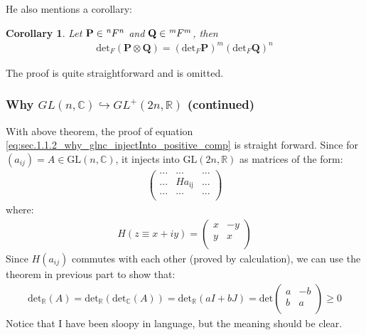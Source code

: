 \documentclass{article}
\numberwithin{equation}{subsection} %
\newtheorem{coro}{Corollary}[section]
\theoremstyle{definition}
\begin{document}
        He also mentions a corollary:
        \begin{coro}
            Let $\mathbf{P}\in \tensor[^n]{F}{^n}$ and $\mathbf{Q}\in
            \tensor[^m]{F}{^m}$, then
            \begin{align}
                \text{det}_F (\mathbf{P\otimes Q}) =
                (\text{det}_F \mathbf{P}) ^m (\text{det}_F \mathbf{Q})^n
            \end{align}
        \end{coro}

        The proof is quite straightforward and is omitted.

        \subsubsection{Why \texorpdfstring{
                $GL(n, \mathbb{C}) \hookrightarrow GL^+(2n,\mathbb{R})$
                }{}(continued)
            }
        With above theorem, the proof of equation 
        \ref{eq:sec.1.1.2_why_glnc_injectInto_positive_comp} 
        is straight forward. Since for 
        $(a_{ij})= A\in \mathrm{GL}(n,\mathbb{C})$, it injects into
        $\mathrm{GL}(2n,\mathbb{R})$ as matrices of the form:
        \begin{align*}
            \left( \begin{array}{ccc}
             \text{...} & \text{...} & \text{...} \\
             \text{...} & H a_{\text{ij}} & \text{...} \\
             \text{...} & \text{...} & \text{...} \\
            \end{array} \right)
        \end{align*}
        where:
        \begin{align*}
            H(z\equiv x+iy)=\left( \begin{array}{cc}
                    x & -y \\
                    y & x \\
            \end{array}\right)
        \end{align*}
        Since $H(a_{ij})$ commutes with each other (proved by calculation),
        we can use the theorem in previous part to show that:
        \begin{align*}
            \mathrm{det_\mathbb{R}}(A) =
            \mathrm{det_\mathbb{R}}  (\mathrm{det_\mathbb{C}}(A))
            = \mathrm{det}_\mathbb{R}(aI+bJ)
            =\mathrm{det}\left(\begin{array}{cc}
                    a & -b\\
                    b & a\\
            \end{array}\right) \geq 0
        \end{align*}
        Notice that I have been sloopy in language, but the meaning should
        be clear.
\end{document}
